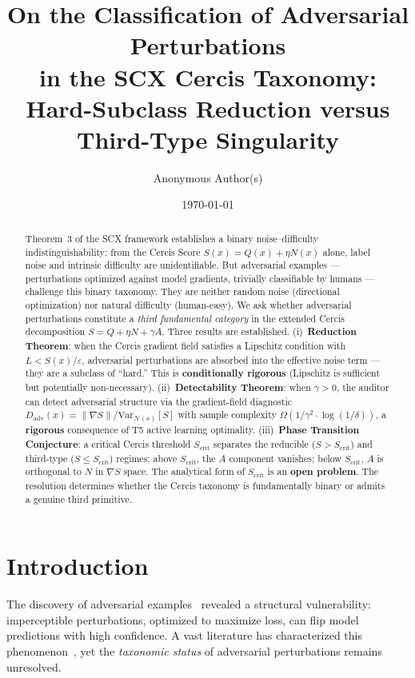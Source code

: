 \documentclass[12pt,a4paper]{article}
\title{\bfseries On the Classification of Adversarial Perturbations\\
in the SCX Cercis Taxonomy:\\
Hard-Subclass Reduction versus Third-Type Singularity}
\author{Anonymous Author(s)}
\date{\today}
\begin{document}
\maketitle

\begin{abstract}
Theorem~3 of the SCX framework establishes a binary noise--difficulty
indistinguishability: from the Cercis Score $S(x) = Q(x) + \eta N(x)$
alone, label noise and intrinsic difficulty are unidentifiable.  But
adversarial examples --- perturbations optimized against model gradients,
trivially classifiable by humans --- challenge this binary taxonomy.  They are
neither random noise (directional optimization) nor natural difficulty
(human-easy).  We ask whether adversarial perturbations constitute a
\emph{third fundamental category} in the extended Cercis decomposition
$S = Q + \eta N + \gamma A$.  Three results are established.
(i)~\textbf{Reduction Theorem}: when the Cercis gradient field satisfies a
Lipschitz condition with $L < S(x)/\varepsilon$, adversarial perturbations
are absorbed into the effective noise term --- they are a subclass of
``hard.''  This is \textbf{conditionally rigorous} (Lipschitz is sufficient
but potentially non-necessary).  (ii)~\textbf{Detectability Theorem}: when
$\gamma > 0$, the auditor can detect adversarial structure via the
gradient-field diagnostic $D_{\mathrm{adv}}(x) = \|\nabla S\| /
\mathrm{Var}_{\mathcal{N}(x)}[S]$ with sample complexity
$\Omega(1/\gamma^2 \cdot \log(1/\delta))$, a \textbf{rigorous} consequence
of T5 active learning optimality.  (iii)~\textbf{Phase Transition
Conjecture}: a critical Cercis threshold $S_{\mathrm{crit}}$ separates
the reducible ($S > S_{\mathrm{crit}}$) and third-type ($S \leq
S_{\mathrm{crit}}$) regimes; above $S_{\mathrm{crit}}$, the $A$ component
vanishes; below $S_{\mathrm{crit}}$, $A$ is orthogonal to $N$ in $\nabla S$
space.  The analytical form of $S_{\mathrm{crit}}$ is an \textbf{open
problem}.  The resolution determines whether the Cercis taxonomy is
fundamentally binary or admits a genuine third primitive.
\end{abstract}

\section{Introduction}

The discovery of adversarial examples~\citep{szegedy2014intriguing,
goodfellow2015explaining} revealed a structural vulnerability: imperceptible
perturbations, optimized to maximize loss, can flip model predictions with
high confidence.  A vast literature has characterized this
phenomenon~\citep{madry2018towards, tsipras2019robustness,
ilyas2019adversarial, carlini2017towards}, yet the \emph{taxonomic status}
of adversarial perturbations remains unresolved.
\end{document}
